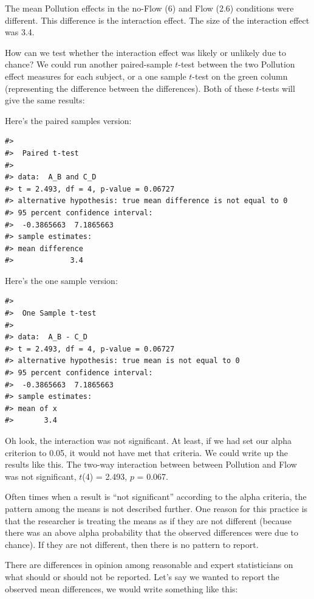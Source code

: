 \documentclass[
  letterpaper,
  DIV=11,
  numbers=noendperiod]{scrreprt}
\begin{document}
The mean Pollution effects in the no-Flow (6) and Flow (2.6) conditions
were different. This difference is the interaction effect. The size of
the interaction effect was 3.4.

How can we test whether the interaction effect was likely or unlikely
due to chance? We could run another paired-sample \(t\)-test between the
two Pollution effect measures for each subject, or a one sample
\(t\)-test on the green column (representing the difference between the
differences). Both of these \(t\)-tests will give the same results:

Here's the paired samples version:

\begin{verbatim}
#> 
#>  Paired t-test
#> 
#> data:  A_B and C_D
#> t = 2.493, df = 4, p-value = 0.06727
#> alternative hypothesis: true mean difference is not equal to 0
#> 95 percent confidence interval:
#>  -0.3865663  7.1865663
#> sample estimates:
#> mean difference 
#>             3.4
\end{verbatim}

Here's the one sample version:

\begin{verbatim}
#> 
#>  One Sample t-test
#> 
#> data:  A_B - C_D
#> t = 2.493, df = 4, p-value = 0.06727
#> alternative hypothesis: true mean is not equal to 0
#> 95 percent confidence interval:
#>  -0.3865663  7.1865663
#> sample estimates:
#> mean of x 
#>       3.4
\end{verbatim}

Oh look, the interaction was not significant. At least, if we had set
our alpha criterion to 0.05, it would not have met that criteria. We
could write up the results like this. The two-way interaction between
between Pollution and Flow was not significant, \(t\)(4) = 2.493, \(p\)
= 0.067.

Often times when a result is ``not significant'' according to the alpha
criteria, the pattern among the means is not described further. One
reason for this practice is that the researcher is treating the means as
if they are not different (because there was an above alpha probability
that the observed differences were due to chance). If they are not
different, then there is no pattern to report.

There are differences in opinion among reasonable and expert
statisticians on what should or should not be reported. Let's say we
wanted to report the observed mean differences, we would write something
like this:
\end{document}

